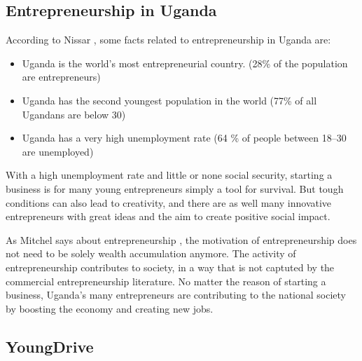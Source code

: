 \subsection{Entrepreneurship in Uganda} %


    According to Nissar \citep{nissar}, some facts related to entrepreneurship in Uganda are:

    \begin{itemize}
      \item Uganda is the world's most entrepreneurial country. (28\% of the population are entrepreneurs)
        \item Uganda has the second youngest population in the world (77\% of all Ugandans are below 30)
        \item Uganda has a very high unemployment rate (64 \% of people between 18–30 are unemployed)
    \end{itemize}


    With a high unemployment rate and little or none social security, starting a business is for many young entrepreneurs simply a tool for survival. But tough conditions can also lead to creativity, and there are as well many innovative entrepreneurs with great ideas and the aim to create positive social impact.

    As Mitchel says about entrepreneurship \citep{mitchel}, the motivation of entrepreneurship does not need to be solely wealth accumulation anymore. The activity of entrepreneurship contributes to society, in a way that is not captuted by the commercial entrepreneurship literature. No matter the reason of starting a business, Uganda's many entrepreneurs are contributing to the national society by boosting the economy and creating new jobs.

    

    \subsection{YoungDrive}


